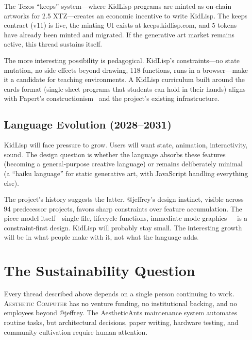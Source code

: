 \documentclass[10pt,letterpaper,twocolumn]{article}
\newcommand{\ac}{\textsc{Aesthetic Computer}}
\begin{document}
The Tezos ``keeps'' system---where KidLisp programs are minted as on-chain artworks for 2.5 XTZ---creates an economic incentive to write KidLisp. The keeps contract (v11) is live, the minting UI exists at keeps.kidlisp.com, and 5 tokens have already been minted and migrated. If the generative art market remains active, this thread sustains itself.

The more interesting possibility is pedagogical. KidLisp's constraints---no state mutation, no side effects beyond drawing, 118 functions, runs in a browser---make it a candidate for teaching environments. A KidLisp curriculum built around the cards format (single-sheet programs that students can hold in their hands) aligns with Papert's constructionism~\citep{papert1980mindstorms} and the project's existing infrastructure.

\subsection{Language Evolution (2028--2031)}

KidLisp will face pressure to grow. Users will want state, animation, interactivity, sound. The design question is whether the language absorbs these features (becoming a general-purpose creative language) or remains deliberately minimal (a ``haiku language'' for static generative art, with JavaScript handling everything else).

The project's history suggests the latter. @jeffrey's design instinct, visible across 94 predecessor projects, favors sharp constraints over feature accumulation. The piece model itself---single file, lifecycle functions, immediate-mode graphics~\citep{scudder2026pieces}---is a constraint-first design. KidLisp will probably stay small. The interesting growth will be in what people make with it, not what the language adds.


\section{The Sustainability Question}
\label{sec:sustainability}

Every thread described above depends on a single person continuing to work. \ac{} has no venture funding, no institutional backing, and no employees beyond @jeffrey. The AestheticAnts maintenance system automates routine tasks, but architectural decisions, paper writing, hardware testing, and community cultivation require human attention.
\end{document}

